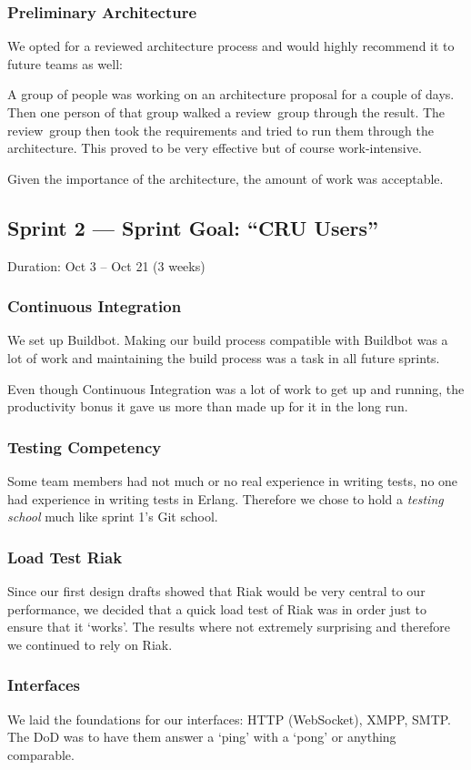 \documentclass[11pt,a4paper]{report}
\begin{document}
\subsubsection{Preliminary Architecture}
We opted for a reviewed architecture process and would highly recommend it to
future teams as well:

A group of people was working on an architecture proposal for a couple of days.
Then one person of that group walked a review~group through the result. The
review~group then took the requirements and tried to run them through the
architecture. This proved to be very effective but of course work-intensive.

Given the importance of the architecture, the amount of work was acceptable.
\subsection*{Sprint 2 --- Sprint Goal: ``CRU Users''}
Duration: Oct 3 -- Oct 21 (3 weeks)
\subsubsection{Continuous Integration}
We set up Buildbot. Making our build process compatible with Buildbot was a lot
of work and maintaining the build process was a task in all future sprints.

Even though Continuous Integration was a lot of work to get up and running, the
productivity bonus it gave us more than made up for it in the long run.

\subsubsection{Testing Competency}
Some team members had not much or no real experience in writing tests, no one
had experience in writing tests in Erlang. Therefore we chose to hold a
{\em testing school\/} much like sprint 1's Git school.

\subsubsection{Load Test Riak}
Since our first design drafts showed that Riak would be very central to our
performance, we decided that a quick load test of Riak was in order just to
ensure that it `works'. The results where not extremely surprising and therefore
we continued to rely on Riak.

\subsubsection{Interfaces}
We laid the foundations for our interfaces: HTTP (WebSocket), XMPP, SMTP.
The DoD was to have them answer a `ping' with a `pong' or anything comparable.
\end{document}
